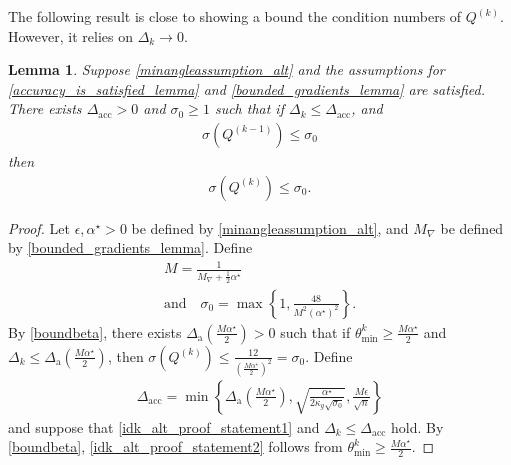 \documentclass{article}
\newtheorem{lemma}[theorem]{Lemma}
\theoremstyle{case}
\numberwithin{theorem}{subsection}
\newcommand{\dacc}{{\Delta_{\textrm{acc}}}}
\newcommand{\dacco}{{\Delta_{\textrm{a}}}}
\newcommand{\dk}{\Delta_k}
\newcommand{\gradf}{\nabla f}
\newcommand{\maxgrad}{{M_{\nabla}}}
\newcommand{\mfk}{{{m}_f}^{(k)}}
\newcommand{\minanglealpha}{{ \alpha^{\star} }}
\newcommand{\qk}{{Q^{(k)}}}
\newcommand{\Rn}{\mathbb R^n}
\newcommand{\thetamink}{{\theta^k_{\textrm{min}}}}
\newcommand{\tr}{{ B_{\infty}\left(\xk, \dk\right) }}
\newcommand{\xk}{{x^{(k)}}}
\newcommand{\epsactive}{{\mathbb A_c}}
\begin{document}
The following result is close to showing a bound the condition numbers of $\qk$.
However, it relies on $\dk \to 0$.
\begin{lemma}
Suppose \cref{minangleassumption_alt}
and the assumptions for \cref{accuracy_is_satisfied_lemma} and \cref{bounded_gradients_lemma} are satisfied.
There exists $\dacc > 0$ and $\sigma_0 \ge 1$ such that if $\dk \le \dacc$, and
\begin{align}
\sigma\left( Q^{(k-1)} \right) \le \sigma_0 \label{idk_alt_proof_statement1}
\end{align}
then 
\begin{align}
\sigma\left( \qk \right) \le \sigma_0. \label{idk_alt_proof_statement2}
\end{align}
\end{lemma}


\begin{proof}
Let $\epsilon, \minanglealpha > 0$ be defined by \cref{minangleassumption_alt}, and $\maxgrad$ be defined by \cref{bounded_gradients_lemma}.
Define
\begin{align}
&M = \frac 1 {\maxgrad + \frac 1 2 \minanglealpha} & \\
&\textrm{and} \quad \sigma_0 = \max\left\{1, \frac{48}{M^2\left(\minanglealpha\right)^2}\right\}.&
\end{align}
By \cref{boundbeta}, there exists $\dacco \left(\frac {M \minanglealpha} 2\right) > 0$ such that if
$\thetamink \ge \frac {M \minanglealpha} 2$ and $\dk \le \dacco \left(\frac {M \minanglealpha} 2\right)$,
then $\sigma\left(\qk\right) \le \frac{12}{\left(\frac{M\minanglealpha}{2}\right)^2} = \sigma_0$.
Define 
\begin{align}
\dacc = \min\left\{
\dacco \left(\frac {M \minanglealpha} 2\right), 
\sqrt{\frac {\minanglealpha}{2\kappa_g\sqrt{\sigma_0}}},
\frac{M \epsilon}{\sqrt{n}}
\right\} \label{define_delta_accuracy2}
\end{align}
and suppose that \cref{idk_alt_proof_statement1} and $\dk \le \dacc$ hold.
By \cref{boundbeta}, \cref{idk_alt_proof_statement2} follows from $\thetamink \ge \frac {M \minanglealpha} 2$.



\end{proof}
\end{document}
